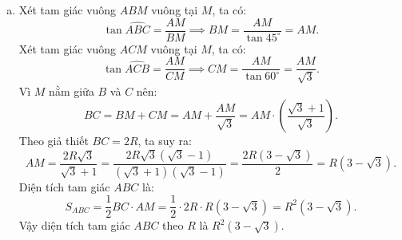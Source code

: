 \begin{bt}
{\begin{enumerate}[a)]
		Xét ba điểm $D, E, M$: các tam giác vuông $\Delta IDO$ (vuông tại $D$), $\Delta IEO$ (vuông tại $E$) và $\Delta IMO$ (vuông tại $M$) đều cùng nhìn đoạn thẳng $IO$ dưới một góc vuông $90^\circ$.\\
		Do đó $5$ điểm $I, D, O, M, E$ cùng nằm trên đường tròn đường kính $IO$.\\
		Suy ra tứ giác $OMED$ nội tiếp đường tròn đường kính $IO$.
		\item Xét tam giác vuông $ABM$ vuông tại $M$, ta có:
		$$\tan \widehat{ABC} = \frac{AM}{BM} \implies BM = \frac{AM}{\tan 45^\circ} = AM.$$
		Xét tam giác vuông $ACM$ vuông tại $M$, ta có:
		$$\tan \widehat{ACB} = \frac{AM}{CM} \implies CM = \frac{AM}{\tan 60^\circ} = \frac{AM}{\sqrt{3}}.$$
		Vì $M$ nằm giữa $B$ và $C$ nên:
		$$BC = BM + CM = AM + \frac{AM}{\sqrt{3}} = AM \cdot \left(\frac{\sqrt{3} + 1}{\sqrt{3}}\right).$$
		Theo giả thiết $BC = 2R$, ta suy ra:
		$$AM = \frac{2R\sqrt{3}}{\sqrt{3} + 1} = \frac{2R\sqrt{3}(\sqrt{3} - 1)}{(\sqrt{3} + 1)(\sqrt{3} - 1)} = \frac{2R(3 - \sqrt{3})}{2} = R(3 - \sqrt{3}).$$
		Diện tích tam giác $ABC$ là:
		$$S_{ABC} = \frac{1}{2} BC \cdot AM = \frac{1}{2} \cdot 2R \cdot R(3 - \sqrt{3}) = R^2(3 - \sqrt{3}).$$
		Vậy diện tích tam giác $ABC$ theo $R$ là $R^2(3 - \sqrt{3})$.
	\end{enumerate}
}
\end{bt}
